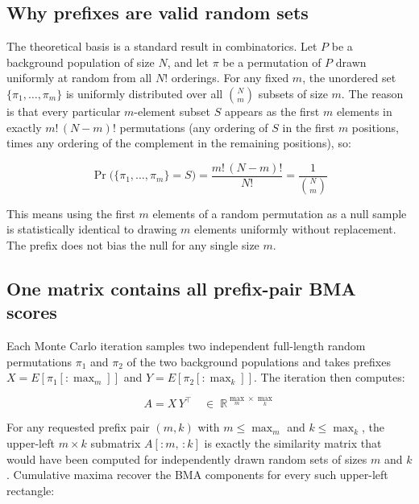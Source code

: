 \documentclass[11pt,a4paper]{article}
\begin{document}
\subsection{Why prefixes are valid random sets}
\label{sec:prefix-proof}

The theoretical basis is a standard result in combinatorics. Let $P$ be a
background population of size $N$, and let $\pi$ be a permutation of $P$
drawn uniformly at random from all $N!$ orderings. For any fixed $m$, the
unordered set $\{\pi_1, \ldots, \pi_m\}$ is uniformly distributed over all
$\binom{N}{m}$ subsets of size $m$. The reason is that every particular
$m$-element subset $S$ appears as the first $m$ elements in exactly
$m!\,(N-m)!$ permutations (any ordering of $S$ in the first $m$ positions,
times any ordering of the complement in the remaining positions), so:

\[
	\Pr\bigl(\{\pi_1, \ldots, \pi_m\} = S\bigr)
	= \frac{m!\,(N-m)!}{N!}
	= \frac{1}{\binom{N}{m}}
\]

This means using the first $m$ elements of a random permutation as a null
sample is statistically identical to drawing $m$ elements uniformly without
replacement. The prefix does not bias the null for any single size $m$.

\subsection{One matrix contains all prefix-pair BMA scores}

Each Monte Carlo iteration samples two independent full-length random permutations
$\pi_1$ and $\pi_2$ of the two background populations and takes prefixes
$X = E[\pi_1[:\max_m]]$ and $Y = E[\pi_2[:\max_k]]$.
The iteration then computes:

\[
	A = X \, Y^\top \quad\in\;\mathbb{R}^{\max_m \times \max_k}
\]

For any requested prefix pair $(m, k)$ with $m \le \max_m$ and $k \le \max_k$,
the upper-left $m \times k$ submatrix $A[{:}m,\, {:}k]$ is exactly the
similarity matrix that would have been computed for independently drawn
random sets of sizes $m$ and $k$. Cumulative maxima recover the BMA
components for every such upper-left rectangle:
\end{document}
